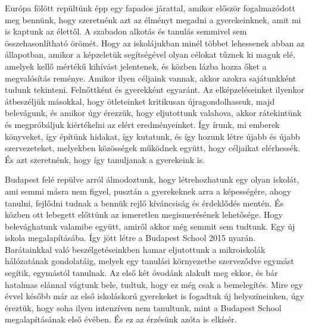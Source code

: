 Európa fölött repültünk épp egy fapados járattal, amikor először fogalmazódott meg bennünk, hogy szeretnénk azt az élményt megadni a gyerekeinknek, amit mi is kaptunk az élettől. A szabadon alkotás és tanulás semmivel sem összehasonlítható örömét. Hogy az iskolájukban minél többet lehessenek abban az állapotban, amikor a képzeletük segítségével olyan célokat tűznek ki maguk elé, amelyek kellő mértékű kihívást jelentenek, és közben lázba hozza őket a megvalósítás reménye. Amikor ilyen céljaink vannak, akkor azokra sajátunkként tudunk tekinteni. Felnőttként és gyerekként egyaránt. Az elképzeléseinket ilyenkor átbeszéljük másokkal, hogy ötleteinket kritikusan újragondolhassuk, majd belevágunk, és amikor úgy érezzük, hogy eljutottunk valahova, akkor rátekintünk és megpróbáljuk kiértékelni az elért eredményeinket. Így írunk, mi emberek könyveket, így építünk hidakat, így kutatunk, és így hozunk létre újabb és újabb szervezeteket, melyekben közösségek működnek együtt, hogy céljaikat elérhessék. És azt szeretnénk, hogy így tanuljanak a gyerekeink is.

Budapest felé repülve arról álmodoztunk, hogy létrehozhatunk egy olyan iskolát, ami semmi másra nem figyel, pusztán a gyerekeknek arra a képességére, ahogy tanulni, fejlődni tudnak a bennük rejlő kíváncsiság és érdeklődés mentén. És közben ott lebegett előttünk az ismeretlen megismerésének lehetősége. Hogy belevághatunk valamibe együtt, amiről akkor még semmit sem tudtunk. Egy új iskola megalapításába. Így jött létre a Budapest School 2015 nyarán. Barátainkkal való beszélgetéseinkben hamar eljutottunk a mikroiskolák hálózatának gondolatáig, melyek egy tanulási környezetbe szerveződve egymást segítik, egymástól tanulnak. Az első két óvodánk alakult meg ekkor, és bár hatalmas elánnal vágtunk bele, tudtuk, hogy ez még csak a bemelegítés. Mire egy évvel később már az első iskoláskorú gyerekeket is fogadtuk új helyszíneinken, úgy éreztük, hogy soha ilyen intenzíven nem tanultunk, mint a Budapest School megalapításának első évében. És ez az érzésünk azóta is elkísér.

